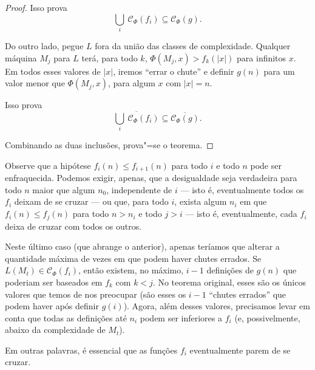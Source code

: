 \begin{proof}
    Isso prova
    \begin{equation*}
        \bigcup_i \ \mathcal C_\Phi(f_i) \subseteq \mathcal C_\Phi(g).
    \end{equation*}

    Do outro lado,
    pegue $L$ fora da união das classes de complexidade.
    Qualquer máquina $M_j$ para $L$
    terá, para todo $k$,
    $\Phi(M_j, x) > f_k(|x|)$ para infinitos $x$.
    Em todos esses valores de $|x|$,
    iremos ``errar o chute''
    e definir $g(n)$
    para um valor menor que $\Phi(M_j, x)$,
    para algum $x$ com $|x| = n$.

    Isso prova
    \begin{equation*}
        \overline{\bigcup_i \ \mathcal C_\Phi(f_i)}
        \subseteq \overline{\mathcal C_\Phi(g)}.
    \end{equation*}

    Combinando as duas inclusões, prova"=se o teorema.
\end{proof}

Observe que a hipótese $f_i(n) \leq f_{i+1}(n)$
para todo $i$ e todo $n$
pode ser enfraquecida.
Podemos exigir, apenas,
que a desigualdade seja verdadeira para todo $n$
maior que algum $n_0$,
independente de $i$
--- isto é, eventualmente todos os $f_i$
deixam de se cruzar
---
ou que, para todo $i$,
exista algum $n_i$ em que
$f_i(n) \leq f_j(n)$ para todo $n > n_i$
e todo $j > i$
--- isto é, eventualmente,
cada $f_i$ deixa de cruzar com todos os outros.

Neste último caso
(que abrange o anterior),
apenas teríamos que alterar a quantidade máxima de vezes
em que podem haver chutes errados.
Se $L(M_t) \in \mathcal C_\Phi(f_i)$,
então existem, no máximo,
$i - 1$ definições de $g(n)$
que poderiam ser baseados em $f_k$
com $k < j$.
No teorema original,
esses são os únicos valores que temos de nos preocupar
(são esses os $i-1$ ``chutes errados'' que podem haver
após definir $g(i)$).
Agora, além desses valores,
precisamos levar em conta que
todas as definições até $n_i$
podem ser inferiores a $f_i$
(e, possivelmente, abaixo da complexidade de $M_t$).

Em outras palavras,
é essencial que as funções $f_i$
eventualmente parem de se cruzar.

